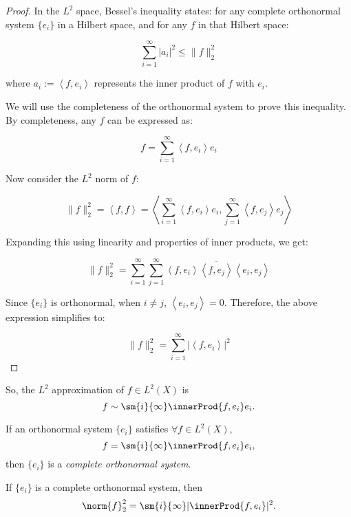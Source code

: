 \begin{proof}
    In the $L^2$ space, Bessel's inequality states: for any 
    complete orthonormal system $\{e_i\}$ in a Hilbert space, 
    and for any $f$ in that Hilbert space:

$$
\sum_{i=1}^{\infty} |a_{i}|^{2} \leq \|f\|_{2}^{2}
$$

where $a_{i}:=\left<f,e_i\right>$ represents the inner 
product of $f$ with $e_i$.

We will use the completeness of the orthonormal system to 
prove this inequality. By completeness, any $f$ can be 
expressed as:

$$
f = \sum_{i=1}^{\infty} \left<f,e_i\right>e_i
$$

Now consider the $L^2$ norm of $f$:

$$
\|f\|_{2}^{2} = \left<f, f\right> = \left<\sum_{i=1}^{\infty} 
\left<f,e_i\right>e_i, \sum_{j=1}^{\infty} \left<f,e_j\right>e_j\right>
$$

Expanding this using linearity and properties of inner products, we get:

$$
\|f\|_{2}^{2} = \sum_{i=1}^{\infty} \sum_{j=1}^{\infty} 
\left<f,e_i\right>\overline{\left<f,e_j\right>}\left<e_i,e_j\right>
$$

Since $\{e_i\}$ is orthonormal, when $i\neq j$, 
$\left<e_i,e_j\right>=0$. Therefore, the above expression 
simplifies to:

$$
\|f\|_{2}^{2} = \sum_{i=1}^{\infty} |\left<f,e_i\right>|^2
$$
\end{proof}
\begin{rem}
    So, the $L^{2}$ approximation of $f\in L^{2}(X)$ is 
    \begin{displaymath}
        f\sim\sm{i}{\infty}\innerProd{f,e_i}e_i.
    \end{displaymath}
\end{rem}
\begin{defn}
    If an orthonormal system $\{e_{i}\}$ satisfies 
    $\forall f\in L^{2}(X)$, 
    \begin{displaymath}
        f=\sm{i}{\infty}\innerProd{f,e_i}e_{i},
    \end{displaymath}    
    then $\{e_{i}\}$ is a \textit{complete orthonormal system}.
\end{defn}
\begin{thm}
    \label{Thm:Parseval}
    If $\{e_{i}\}$ is a complete orthonormal system, 
    then 
    \begin{displaymath}
        \norm{f}_{2}^{2}=\sm{i}{\infty}|\innerProd{f,e_{i}}|^{2}.
    \end{displaymath}
\end{thm}
